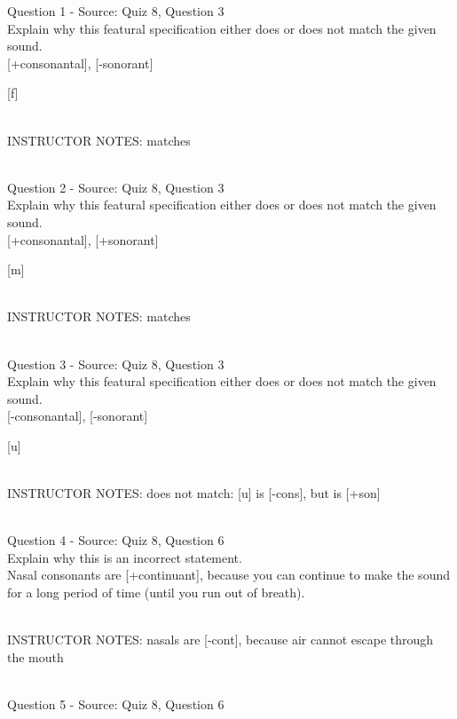 \documentclass[12pt]{article}
\begin{document}
{\large Question 1} - Source: Quiz 8, Question 3\\

Explain why this featural specification either does or does not match the given sound.\\

{[+consonantal]}, {[-sonorant]}

{[f]}


~\\
INSTRUCTOR NOTES: matches


~\\

{\large Question 2} - Source: Quiz 8, Question 3\\

Explain why this featural specification either does or does not match the given sound.\\

{[+consonantal]}, {[+sonorant]}

{[m]}


~\\
INSTRUCTOR NOTES: matches


~\\

{\large Question 3} - Source: Quiz 8, Question 3\\

Explain why this featural specification either does or does not match the given sound.\\

{[-consonantal]}, {[-sonorant]}

{[u]}


~\\
INSTRUCTOR NOTES: does not match: [u] is [-cons], but is [+son]


~\\

{\large Question 4} - Source: Quiz 8, Question 6\\

Explain why this is an incorrect statement.\\

Nasal consonants are {[+continuant]}, because you can continue to make the sound for a long period of time (until you run out of breath).


~\\
INSTRUCTOR NOTES: nasals are [-cont], because air cannot escape through the mouth


~\\

{\large Question 5} - Source: Quiz 8, Question 6\\
\end{document}
